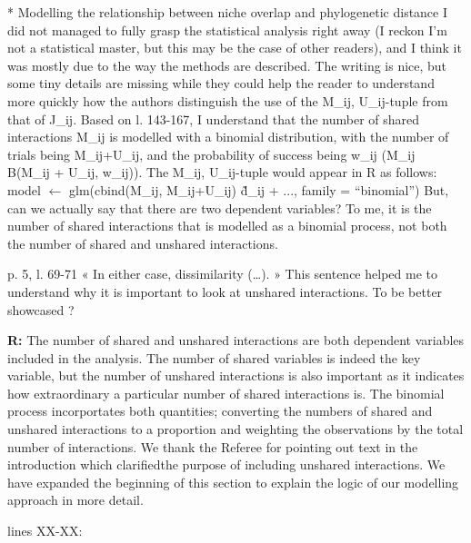 \documentclass[12pt]{letter}
\newenvironment{refquote}{\bigskip \begin{it}}{\end{it}\smallskip}
\begin{document}
		\begin{refquote}
			* Modelling the relationship between niche overlap and phylogenetic distance
			I did not managed to fully grasp the statistical analysis right away (I reckon I'm not a statistical master, but this may be the case of other readers), and I think it was mostly due to the way the methods are described. The writing is nice, but some tiny details are missing while they could help the reader to understand more quickly how the authors distinguish the use of the {M\_ij, U\_ij}-tuple from that of J\_ij.
			Based on l. 143-167, I understand that the number of shared interactions M\_ij is modelled with a binomial distribution, with the number of trials being M\_ij+U\_ij, and the probability of success being w\_ij (M\_ij ~ B(M\_ij + U\_ij, w\_ij)). The {M\_ij, U\_ij}-tuple would appear in R as follows:
			model $\leftarrow$ glm(cbind(M\_ij, M\_ij+U\_ij) \~ d\_ij + ..., family = “binomial”)
			But, can we actually say that there are two dependent variables? To me, it is the number of shared interactions that is modelled as a binomial process, not both the number of shared and unshared interactions.

			\smallskip

			p. 5, l. 69-71 « In either case, dissimilarity (…). » This sentence helped me to understand why it is important to look at unshared interactions. To be better showcased ?

		\end{refquote}


		\textbf{R:} The number of shared and unshared interactions are both dependent variables included in the analysis. The number of shared variables is indeed the key variable, but the number of unshared interactions is also important as it indicates how extraordinary a particular number of shared interactions is. The binomial process incorportates both quantities; converting the numbers of shared and unshared interactions to a proportion and weighting the observations by the total number of interactions. We thank the Referee for pointing out text in the introduction which clarifiedthe purpose of including unshared interactions. We have expanded the beginning of this section to explain the logic of our modelling approach in more detail.


		lines XX-XX:
\end{document}
